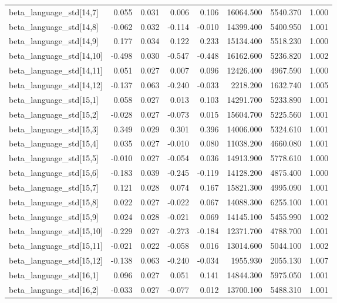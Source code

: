\begin{tabular}{lrrrrrrr}
beta\_language\_std[14,7] & 0.055 & 0.031 & 0.006 & 0.106 & 16064.500 & 5540.370 & 1.000 \\
beta\_language\_std[14,8] & -0.062 & 0.032 & -0.114 & -0.010 & 14399.400 & 5400.950 & 1.001 \\
beta\_language\_std[14,9] & 0.177 & 0.034 & 0.122 & 0.233 & 15134.400 & 5518.230 & 1.000 \\
beta\_language\_std[14,10] & -0.498 & 0.030 & -0.547 & -0.448 & 16162.600 & 5236.820 & 1.002 \\
beta\_language\_std[14,11] & 0.051 & 0.027 & 0.007 & 0.096 & 12426.400 & 4967.590 & 1.000 \\
beta\_language\_std[14,12] & -0.137 & 0.063 & -0.240 & -0.033 & 2218.200 & 1632.740 & 1.005 \\
beta\_language\_std[15,1] & 0.058 & 0.027 & 0.013 & 0.103 & 14291.700 & 5233.890 & 1.001 \\
beta\_language\_std[15,2] & -0.028 & 0.027 & -0.073 & 0.015 & 15604.700 & 5225.560 & 1.001 \\
beta\_language\_std[15,3] & 0.349 & 0.029 & 0.301 & 0.396 & 14006.000 & 5324.610 & 1.001 \\
beta\_language\_std[15,4] & 0.035 & 0.027 & -0.010 & 0.080 & 11038.200 & 4660.080 & 1.001 \\
beta\_language\_std[15,5] & -0.010 & 0.027 & -0.054 & 0.036 & 14913.900 & 5778.610 & 1.000 \\
beta\_language\_std[15,6] & -0.183 & 0.039 & -0.245 & -0.119 & 14128.200 & 4875.400 & 1.000 \\
beta\_language\_std[15,7] & 0.121 & 0.028 & 0.074 & 0.167 & 15821.300 & 4995.090 & 1.001 \\
beta\_language\_std[15,8] & 0.022 & 0.027 & -0.022 & 0.067 & 14088.300 & 6255.100 & 1.001 \\
beta\_language\_std[15,9] & 0.024 & 0.028 & -0.021 & 0.069 & 14145.100 & 5455.990 & 1.002 \\
beta\_language\_std[15,10] & -0.229 & 0.027 & -0.273 & -0.184 & 12371.700 & 4788.700 & 1.001 \\
beta\_language\_std[15,11] & -0.021 & 0.022 & -0.058 & 0.016 & 13014.600 & 5044.100 & 1.002 \\
beta\_language\_std[15,12] & -0.138 & 0.063 & -0.240 & -0.034 & 1955.930 & 2055.130 & 1.007 \\
beta\_language\_std[16,1] & 0.096 & 0.027 & 0.051 & 0.141 & 14844.300 & 5975.050 & 1.001 \\
beta\_language\_std[16,2] & -0.033 & 0.027 & -0.077 & 0.012 & 13700.100 & 5488.310 & 1.001 \\

\end{tabular}
